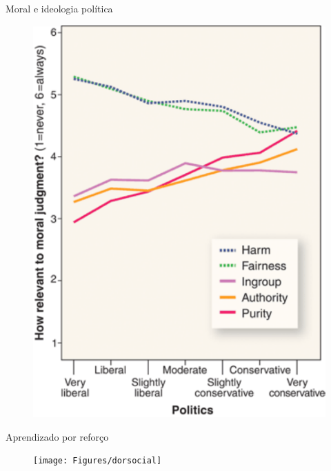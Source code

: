 \documentclass{beamer}
\begin{document}
    \begin{frame}{Moral e ideologia política}%
        \begin{figure} 
            \centering
            \includegraphics[scale=0.4]{Figures/haidt_science}
        \end{figure}  
        
    \end{frame}%

    \begin{frame}{Aprendizado por reforço}%
        \begin{figure}
        \begin{center}
        \texttt{[image: Figures/dorsocial]}
        \end{center}
        \end{figure}
    \end{frame}%
    
\end{document}
